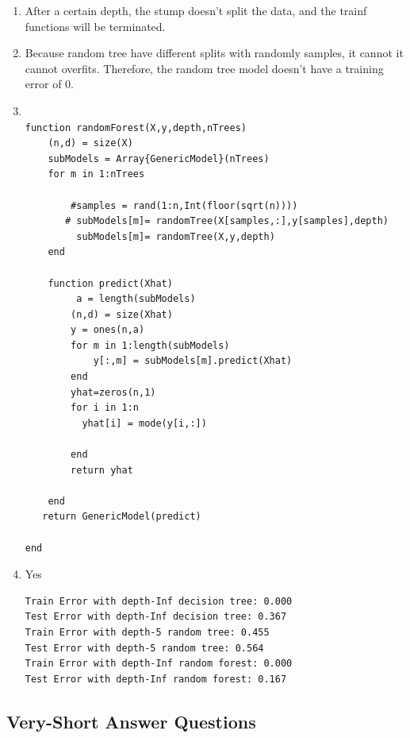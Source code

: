 \documentclass{article}
\begin{document}
\begin{enumerate}
\item After a certain depth, the stump doesn't split the data, and the trainf functions will be terminated.
\item  Because random tree have different splits with randomly samples, it cannot it cannot overfits. Therefore, the random tree model doesn't have a training error of 0.

  

\item \begin{verbatim}

function randomForest(X,y,depth,nTrees)
	(n,d) = size(X)
	subModels = Array{GenericModel}(nTrees)
	for m in 1:nTrees

		#samples = rand(1:n,Int(floor(sqrt(n))))
       # subModels[m]= randomTree(X[samples,:],y[samples],depth)
         subModels[m]= randomTree(X,y,depth)
	end
 
	function predict(Xhat)
		 a = length(subModels)
        (n,d) = size(Xhat)
        y = ones(n,a)
	    for m in 1:length(subModels)
	    	y[:,m] = subModels[m].predict(Xhat)
	    end
	    yhat=zeros(n,1)
	    for i in 1:n
	      yhat[i] = mode(y[i,:])
	  
	    end
	    return yhat
	    
	end	
   return GenericModel(predict)

end
\end{verbatim}

\item
Yes
 \begin{verbatim}
Train Error with depth-Inf decision tree: 0.000
Test Error with depth-Inf decision tree: 0.367
Train Error with depth-5 random tree: 0.455
Test Error with depth-5 random tree: 0.564
Train Error with depth-Inf random forest: 0.000
Test Error with depth-Inf random forest: 0.167
\end{verbatim}


\end{enumerate}

\subsection{Very-Short Answer Questions}
\end{document}
